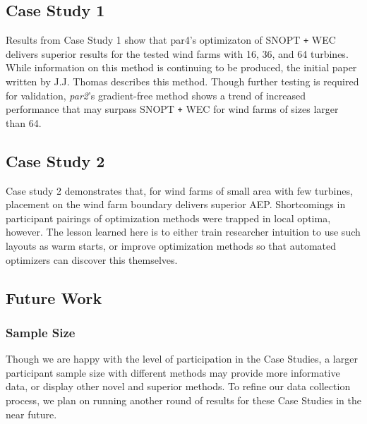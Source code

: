 \subsection{Case Study 1}

Results from Case Study 1 show that par4's optimizaton of SNOPT \texttt{+} WEC delivers superior results for the tested wind farms with 16, 36, and 64 turbines.
While information on this method is continuing to be produced, the initial paper written by J.J. Thomas\cite{Thomas2018} describes this method.
Though further testing is required for validation, \textit{par2}'s gradient-free method shows a trend of increased performance that may surpass SNOPT \texttt{+} WEC for wind farms of sizes larger than 64.

\subsection{Case Study 2}

Case study 2 demonstrates that, for wind farms of small area with few turbines, placement on the wind farm boundary delivers superior AEP.
Shortcomings in participant pairings of optimization methods were trapped in local optima, however.
The lesson learned here is to either train researcher intuition to use such layouts as warm starts, or improve optimization methods so that automated optimizers can discover this themselves.

\subsection{Future Work}\label{ftr-wrk}

\subsubsection{Sample Size}

Though we are happy with the level of participation in the Case Studies, a larger participant sample size with different methods may provide more informative data, or display other novel and superior methods.
To refine our data collection process, we plan on running another round of results for these Case Studies in the near future.

